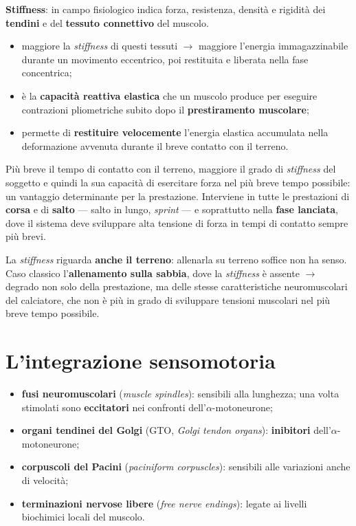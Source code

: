 \textbf{Stiffness}: in campo fisiologico indica forza, resistenza, densità e rigidità dei
\textbf{tendini} e del \textbf{tessuto connettivo} del muscolo.

\begin{itemize}
  \item maggiore la \textit{stiffness} di questi tessuti $\rightarrow$ maggiore l'energia
    immagazzinabile durante un movimento eccentrico, poi restituita e liberata nella fase
    concentrica;
  \item è la \textbf{capacità reattiva elastica} che un muscolo produce per eseguire contrazioni
    pliometriche subito dopo il \textbf{prestiramento muscolare};
  \item permette di \textbf{restituire velocemente} l'energia elastica accumulata nella
    deformazione avvenuta durante il breve contatto con il terreno.
\end{itemize}

Più breve il tempo di contatto con il terreno, maggiore il grado di \textit{stiffness} del
soggetto e quindi la sua capacità di esercitare forza nel più breve tempo possibile: un vantaggio
determinante per la prestazione. Interviene in tutte le prestazioni di \textbf{corsa} e di
\textbf{salto} --- salto in lungo, \textit{sprint} --- e soprattutto nella \textbf{fase lanciata},
dove il sistema deve sviluppare alta tensione di forza in tempi di contatto sempre più brevi.

La \textit{stiffness} riguarda \textbf{anche il terreno}: allenarla su terreno soffice non ha
senso. Caso classico l'\textbf{allenamento sulla sabbia}, dove la \textit{stiffness} è assente
$\rightarrow$ degrado non solo della prestazione, ma delle stesse caratteristiche neuromuscolari
del calciatore, che non è più in grado di sviluppare tensioni muscolari nel più breve tempo
possibile.

\section{L'integrazione sensomotoria}

\begin{itemize}
  \item \textbf{fusi neuromuscolari} (\textit{muscle spindles}): sensibili alla lunghezza; una
    volta stimolati sono \textbf{eccitatori} nei confronti dell'$\alpha$-motoneurone;
  \item \textbf{organi tendinei del Golgi} (GTO, \textit{Golgi tendon organs}):
    \textbf{inibitori} dell'$\alpha$-motoneurone;
  \item \textbf{corpuscoli del Pacini} (\textit{paciniform corpuscles}): sensibili alle
    variazioni anche di velocità;
  \item \textbf{terminazioni nervose libere} (\textit{free nerve endings}): legate ai livelli
    biochimici locali del muscolo.
\end{itemize}

